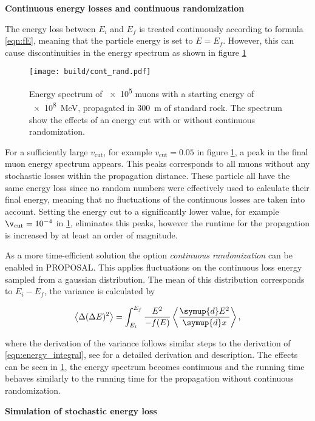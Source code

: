 \textbf{Continuous energy losses and continuous randomization}

The energy loss between $E_i$ and $E_f$ is treated continuously according to formula \ref{eqn:fE}, meaning that the particle energy is set to $E = E_f$.
However, this can cause discontinuities in the energy spectrum as shown in figure \ref{fig:cont_rand}

\begin{figure}
    \centering
    \texttt{[image: build/cont\_rand.pdf]}
    \caption[]{Energy spectrum of \num{e5} muons with a starting energy of \SI{e8}{\mega\electronvolt}, propagated in \SI{300}{\meter} of standard rock\footnotemark. The spectrum show the effects of an energy cut with or without continuous randomization.}
    \label{fig:cont_rand}
\end{figure}

For a sufficiently large $v_\text{cut}$, for example $v_\text{cut} = 0.05$ in figure \ref{fig:cont_rand}, a peak in the final muon energy spectrum appears.
This peaks corresponds to all muons without any stochastic losses within the propagation distance.
These particle all have the same energy loss since no random numbers were effectively used to calculate their final energy, meaning that no fluctuations of the continuous losses are taken into account.
Setting the energy cut to a significantly lower value, for example $\v_\text{cut} = \num{e-4}$ in \ref{fig:cont_rand}, eliminates this peaks, however the runtime for the propagation is increased by at least an order of magnitude.

As a more time-efficient solution the option \emph{continuous randomization} can be enabled in PROPOSAL.
This applies fluctuations on the continuous loss energy sampled from a gaussian distribution.
The mean of this distribution corresponds to $E_i - E_f$, the variance is calculated by

\begin{equation}
	\left< \Delta (\Delta E)^2 \right> = \int_{E_i}^{E_f} \frac{E^2}{-f(E)} \left< \frac{\symup{d}E^2}{\symup{d}x} \right>,
\end{equation}

where the derivation of the variance follows similar steps to the derivation of \ref{eqn:energy_integral}, see \cite{chirkin2004propagating} for a detailed derivation and description. 
The effects can be seen in \ref{fig:cont_rand}, the energy spectrum becomes continuous and the running time behaves similarly to the running time for the propagation without continuous randomization.

\textbf{Simulation of stochastic energy loss}

